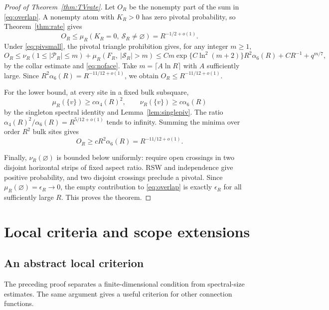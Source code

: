 \documentclass[11pt]{amsart}
\theoremstyle{remark}
\newcommand{\cS}{\mathcal S}
\newcommand{\cP}{\mathcal P}
\begin{document}
\begin{proof}[Proof of Theorem~\ref{thm:TVrate}]
Let $O_R$ be the nonempty part of the sum in \eqref{eq:overlap}. A nonempty atom with $K_R>0$ has zero pivotal probability, so Theorem~\ref{thm:rate} gives
\[
 O_R\le\mu_R(K_R=0,\ \cS_R\ne\varnothing)=R^{-1/2+o(1)}.
\]
Under \eqref{eq:pivsmall}, the pivotal triangle prohibition gives, for any integer $m\ge1$,
\[
 O_R\le\nu_R(1\le|\cP_R|\le m)+\mu_R(F_R,\ |\cS_R|>m)
 \le Cm\exp\{C\ln^2(m+2)\}R^2\alpha_6(R)+CR^{-1}+q^{m/7},
\]
by the collar estimate and \eqref{eq:noface}. Take $m=\lceil A\ln R\rceil$ with $A$ sufficiently large. Since $R^2\alpha_6(R)=R^{-11/12+o(1)}$, we obtain $O_R\le R^{-11/12+o(1)}$.

For the lower bound, at every site in a fixed bulk subsquare,
\[
 \mu_R(\{v\})\ge c\alpha_4(R)^2,\qquad
 \nu_R(\{v\})\ge c\alpha_6(R)
\]
by the singleton spectral identity \cite[equation~(3.6)]{GPS} and Lemma~\ref{lem:singlepiv}. The ratio $\alpha_4(R)^2/\alpha_6(R)=R^{5/12+o(1)}$ tends to infinity. Summing the minima over order $R^2$ bulk sites gives
\[
 O_R\ge cR^2\alpha_6(R)=R^{-11/12+o(1)}.
\]

Finally, $\nu_R(\varnothing)$ is bounded below uniformly: require open crossings in two disjoint horizontal strips of fixed aspect ratio. RSW and independence give positive probability, and two disjoint crossings preclude a pivotal. Since $\mu_R(\varnothing)=\epsilon_R\to0$, the empty contribution to \eqref{eq:overlap} is exactly $\epsilon_R$ for all sufficiently large $R$. This proves the theorem.
\end{proof}

\section{Local criteria and scope extensions}\label{sec:localscope}
\subsection{An abstract local criterion}\label{sec:criterion}

The preceding proof separates a finite-dimensional condition from spectral-size estimates. The same argument gives a useful criterion for other connection functions.
\end{document}
